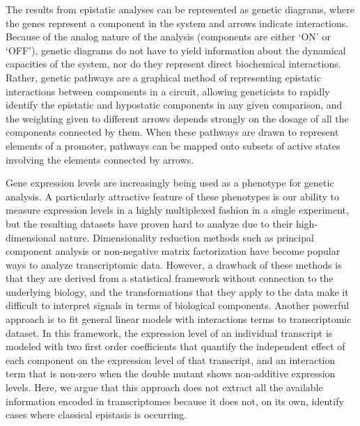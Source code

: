 The results from epistatic analyses can be represented as genetic diagrams,
where the genes represent a component in the system and arrows indicate
interactions. Because of the analog nature of the analysis (components are
either `ON' or `OFF'), genetic diagrams do not have to yield information about
the dynamical capacities of the system, nor do they represent direct biochemical
interactions. Rather, genetic pathways are a graphical method of representing
epistatic interactions between components in a circuit, allowing geneticists to
rapidly identify the epistatic and hypostatic components in any given
comparison, and the weighting given to different arrows depends strongly on the
dosage of all the components connected by them. When these pathways are drawn to
represent elements of a promoter, pathways can be mapped onto subsets of active
states involving the elements connected by arrows.

Gene expression levels are increasingly being used as a phenotype for genetic
analysis. A particularly attractive feature of these phenotypes is our ability
to measure expression levels in a highly multiplexed fashion in a single
experiment, but the resulting datasets have proven hard to analyze due to their
high-dimensional nature. Dimensionality reduction methods such as principal
component analysis or non-negative matrix factorization have become popular ways
to analyze transcriptomic data. However, a drawback of these methods is that
they are derived from a statistical framework without connection to the
underlying biology, and the transformations that they apply to the data make it
difficult to interpret signals in terms of biological components. Another
powerful approach is to fit general linear models with interactions terms to
transcriptomic dataset. In this framework, the expression level of an individual
transcript is modeled with two first order coefficients that quantify the
independent effect of each component on the expression level of that transcript,
and an interaction term that is non-zero when the double mutant shows
non-additive expression levels. Here, we argue that this approach does not
extract all the available information encoded in transcriptomes because it does
not, on its own, identify cases where classical epistasis is occurring.

